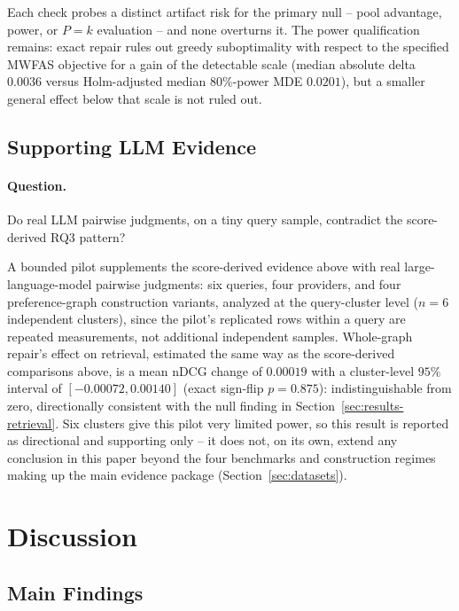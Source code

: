 \documentclass[pdflatex,sn-basic,Numbered]{sn-jnl}
\begin{document}
Each check probes a distinct artifact risk for the primary null -- pool
advantage, power, or $P=k$ evaluation -- and none overturns it. The power
qualification remains: exact repair rules out greedy suboptimality with
respect to the specified MWFAS objective for a gain of the detectable scale
(median absolute delta $0.0036$ versus Holm-adjusted median $80\%$-power MDE
$0.0201$), but a smaller general effect below that scale is not ruled out.

\subsection{Supporting LLM Evidence}
\label{sec:results-llm}

\paragraph{Question.}
Do real LLM pairwise judgments, on a tiny query sample, contradict the
score-derived RQ3 pattern?

A bounded pilot supplements the score-derived evidence above with real
large-language-model pairwise judgments: six queries, four providers, and
four preference-graph construction variants, analyzed at the query-cluster
level ($n=6$ independent clusters), since the pilot's replicated rows
within a query are repeated measurements, not additional independent
samples. Whole-graph repair's effect on retrieval, estimated the same way
as the score-derived comparisons above, is a mean nDCG change of
$0.00019$ with a cluster-level $95\%$ interval of $[-0.00072, 0.00140]$
(exact sign-flip $p=0.875$): indistinguishable from zero, directionally
consistent with the null finding in Section~\ref{sec:results-retrieval}.
Six clusters give this pilot very limited power, so this result is
reported as directional and supporting only -- it does not, on its own,
extend any conclusion in this paper beyond the four benchmarks and
construction regimes making up the main evidence package
(Section~\ref{sec:datasets}).

\section{Discussion}
\label{sec:discussion}

\subsection{Main Findings}
\label{sec:discussion-main}
\end{document}
